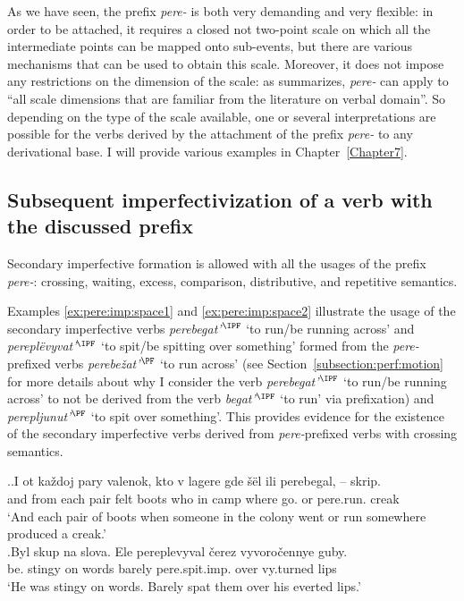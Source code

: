 As we have seen, the prefix \textit{pere-} is both very demanding and very flexible: in order to be attached, it requires a closed not two-point scale on which all the intermediate points can be mapped onto sub-events, but there are various mechanisms that can be used to obtain this scale. Moreover, it does not impose any restrictions on the dimension of the scale: as \citet[151]{Kagan:book} summarizes, \textit{pere-} can apply to ``all scale dimensions that are familiar from the literature on verbal domain''. So depending on the type of the scale available, one or several interpretations are possible for the verbs derived by the attachment of the prefix \textit{pere-} to any derivational base. I will provide various examples in Chapter~\ref{Chapter7}.

\subsection{Subsequent imperfectivization of a verb with the discussed prefix}
Secondary imperfective formation is allowed with all the usages of the prefix \textit{pere-}: crossing, waiting, excess, comparison, distributive, and repetitive semantics.

Examples \ref{ex:pere:imp:space1} and \ref{ex:pere:imp:space2} illustrate the usage of the secondary imperfective verbs \textit{perebegat'}$^{\IPF}$ `to run/be running across' and \textit{perepl\"{e}vyvat'}$^{\IPF}$ `to spit/be spitting over something' formed from the \textit{pere-}prefixed verbs \textit{perebe\v{z}at'}$^{\PF}$ `to run across' (see Section~\ref{subsection:perf:motion} for more details about why I consider the verb \textit{pe\-re\-be\-gat'}$^{\IPF}$ `to run/be running across' to not be derived from the verb \textit{begat'}$^{\IPF}$ `to run' via prefixation) and \textit{perepljunut'}$^{\PF}$ `to spit over something'. This provides evidence for the existence of the secondary imperfective verbs derived from \textit{pere-}prefixed verbs with crossing semantics.

\ex.\ag.\label{ex:pere:imp:space1}I ot ka\v{z}doj pary valenok, kto v lagere gde \v{s}\"{e}l ili perebegal, -- skrip.\\
and from each pair {felt boots} who in camp where go. or pere.run. {} creak\\
\trans `And each pair of boots when someone in the colony went or run somewhere produced a creak.'\\
\bg.\label{ex:pere:imp:space2}Byl skup na slova. Ele pereplevyval \v{c}erez vyvoro\v{c}ennye guby.\\
be. stingy on words barely pere.spit.imp. over vy.turned lips\\
\trans `He was stingy on words. Barely spat them over his everted lips.'\\

